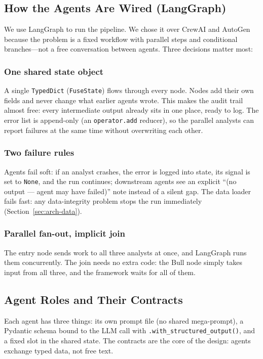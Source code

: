 \documentclass[conference]{IEEEtran}
\begin{document}
\subsection{How the Agents Are Wired (LangGraph)}

We use LangGraph \cite{langgraph2024} to run the pipeline. We chose it over CrewAI and AutoGen because the problem is a fixed workflow with parallel steps and conditional branches---not a free conversation between agents. Three decisions matter most:

\subsubsection{One shared state object} A single \texttt{TypedDict} (\texttt{FuseState}) flows through every node. Nodes add their own fields and never change what earlier agents wrote. This makes the audit trail almost free: every intermediate output already sits in one place, ready to log. The error list is append-only (an \texttt{operator.add} reducer), so the parallel analysts can report failures at the same time without overwriting each other.

\subsubsection{Two failure rules} Agents fail soft: if an analyst crashes, the error is logged into state, its signal is set to \texttt{None}, and the run continues; downstream agents see an explicit ``(no output --- agent may have failed)'' note instead of a silent gap. The data loader fails fast: any data-integrity problem stops the run immediately (Section~\ref{sec:arch-data}).

\subsubsection{Parallel fan-out, implicit join} The entry node sends work to all three analysts at once, and LangGraph runs them concurrently. The join needs no extra code: the Bull node simply takes input from all three, and the framework waits for all of them.

\subsection{Agent Roles and Their Contracts}

Each agent has three things: its own prompt file (no shared mega-prompt), a Pydantic schema bound to the LLM call with \texttt{.with\_structured\_output()}, and a fixed slot in the shared state. The contracts are the core of the design: agents exchange typed data, not free text.
\end{document}
